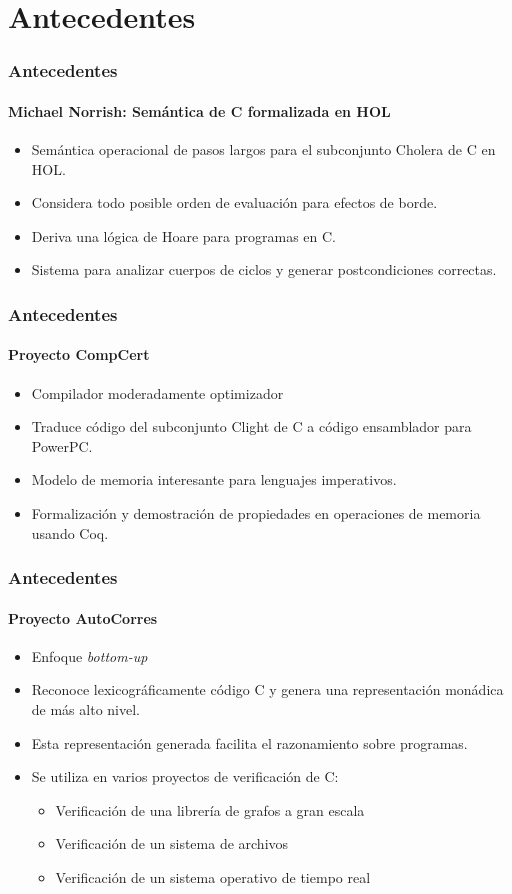 \section{Antecedentes}


\begin{frame}
\frametitle{Antecedentes}
\framesubtitle{Michael Norrish: Semántica de C formalizada en HOL}

\begin{itemize}
\item{Semántica operacional de pasos largos para el subconjunto Cholera de C en HOL.}
\item{Considera todo posible orden de evaluación para efectos de borde.}
\item{Deriva una lógica de Hoare para programas en C.}
\item{Sistema para analizar cuerpos de ciclos y generar postcondiciones correctas.}
\end{itemize}


\end{frame}


\begin{frame}
\frametitle{Antecedentes}
\framesubtitle{Proyecto CompCert}

\begin{itemize}
\item{Compilador moderadamente optimizador}
\item{Traduce código del subconjunto Clight de C a código ensamblador para PowerPC.}
\item{Modelo de memoria interesante para lenguajes imperativos.}
\item{Formalización y demostración de propiedades en operaciones de memoria usando Coq.}
\end{itemize}


\end{frame}


\begin{frame}
\frametitle{Antecedentes}
\framesubtitle{Proyecto AutoCorres}

\begin{itemize}
\item{Enfoque \textit{bottom-up}}
\item{Reconoce lexicográficamente código C y genera una representación monádica de más alto nivel.}
\item{Esta representación generada facilita el razonamiento sobre programas.}
\item{Se utiliza en varios proyectos de verificación de C:}
\begin{itemize}
\item{Verificación de una librería de grafos a gran escala}
\item{Verificación de un sistema de archivos}
\item{Verificación de un sistema operativo de tiempo real}
\end{itemize}
\end{itemize}


\end{frame}
